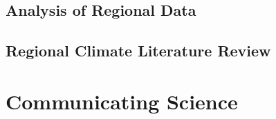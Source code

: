 \documentclass{article}\usepackage[]{graphicx}\usepackage[]{color}
\newenvironment{itemize*}%
  {\begin{itemize}%
    \setlength{\itemsep}{0pt}%
    \setlength{\parskip}{0pt}}%
  {\end{itemize}}
\begin{document}
\subsection{Analysis of Regional Data}



\subsection{Regional Climate Literature Review}



\section{Communicating Science}







\end{document}
